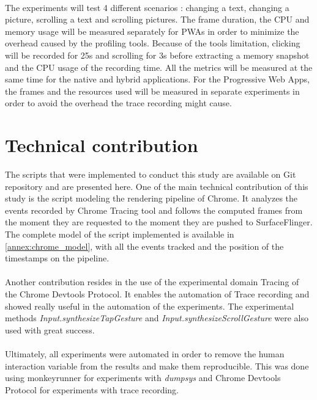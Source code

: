 \documentclass{kththesis}
\begin{document}
\paragraph{}
The experiments will test 4 different scenarios : changing a text, changing a picture, scrolling a text and scrolling pictures. The frame duration, the CPU and memory usage will be measured separately for PWAs in order to minimize the overhead caused by the profiling tools. \newline
Because of the tools limitation, clicking will be recorded for 25s and scrolling for 3s before extracting a memory snapshot and the CPU usage of the recording time. All the metrics will be measured at the same time for the native and hybrid applications. For the Progressive Web Apps, the frames and the resources used will be measured in separate experiments in order to avoid the overhead the trace recording might cause.

\color{black}


\section{Technical contribution}

The scripts that were implemented to conduct this study are available on Git repository and are presented here. One of the main technical contribution of this study is the script modeling the rendering pipeline of Chrome. It analyzes the events recorded by Chrome Tracing tool and follows the computed frames from the moment they are requested to the moment they are pushed to SurfaceFlinger. The complete model of the script implemented is available in \autoref{annex:chrome_model}, with all the events tracked and the position of the timestamps on the pipeline. %
\paragraph{}
Another contribution resides in the use of the experimental domain Tracing of the Chrome Devtools Protocol. It enables the automation of Trace recording and showed really useful in the automation of the experiments. The experimental methods \textit{Input.synthesizeTapGesture} and \textit{Input.synthesizeScrollGesture} were also used with great success.
\paragraph{}
Ultimately, all experiments were automated in order to remove the human interaction variable from the results and make them reproducible. This was done using monkeyrunner for experiments with \textit{dumpsys} and Chrome Devtools Protocol for experiments with trace recording.
\end{document}
